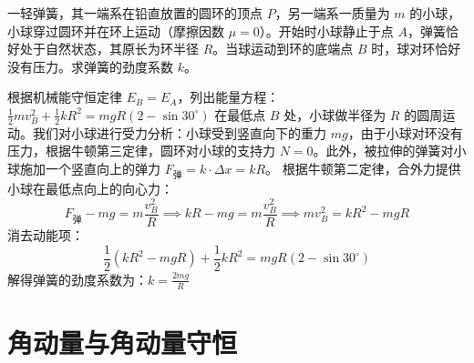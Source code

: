 \documentclass[lang=cn,11pt]{elegantbook}
\begin{document}
\begin{example}
一轻弹簧，其一端系在铅直放置的圆环的顶点 $P$，另一端系一质量为 $m$ 的小球，小球穿过圆环并在环上运动（摩擦因数 $\mu=0$）。开始时小球静止于点 $A$，弹簧恰好处于自然状态，其原长为环半径 $R$。当球运动到环的底端点 $B$ 时，球对环恰好没有压力。求弹簧的劲度系数 $k$。
\end{example}
\begin{solution}
根据机械能守恒定律 $E_B = E_A$，列出能量方程：
 \(\frac{1}{2}mv_B^2 + \frac{1}{2}kR^2 = mgR(2 - \sin 30^\circ)\) 
在最低点 $B$ 处，小球做半径为 $R$ 的圆周运动。我们对小球进行受力分析：小球受到竖直向下的重力 $mg$，由于小球对环没有压力，根据牛顿第三定律，圆环对小球的支持力 $N = 0$。此外，被拉伸的弹簧对小球施加一个竖直向上的弹力 $F_{\text{弹}} = k \cdot \Delta x = kR$。
根据牛顿第二定律，合外力提供小球在最低点向上的向心力：
\[
F_{\text{弹}} - mg = m\frac{v_B^2}{R} \implies kR - mg = m\frac{v_B^2}{R}\implies mv_B^2 = kR^2 - mgR
\]消去动能项：
\[
\frac{1}{2}(kR^2 - mgR) + \frac{1}{2}kR^2 = mgR(2 - \sin 30^\circ)
\]
解得弹簧的劲度系数为：$k = \frac{2mg}{R}$
\end{solution}

\section{角动量与角动量守恒}
\end{document}
